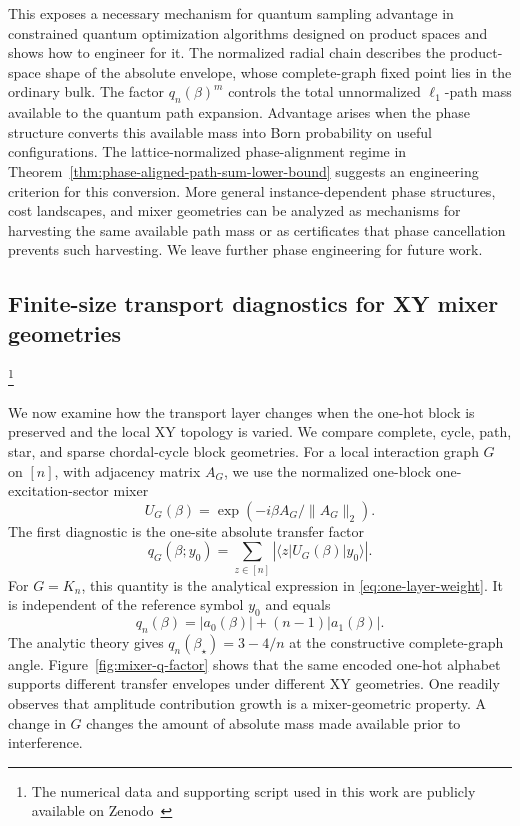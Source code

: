 \documentclass[a4paper,onecolumn,11pt,unpublished]{quantumarticle}
\theoremstyle{remark}
\begin{document}
This exposes a necessary mechanism for quantum sampling advantage in constrained quantum optimization algorithms designed on product spaces and shows how to engineer for it. The
normalized radial chain describes the product-space shape of the absolute
envelope, whose complete-graph fixed point lies in the ordinary bulk.  The
factor \(q_n(\beta)^m\) controls the total unnormalized \(\ell_1\)-path mass
available to the quantum path expansion.  Advantage arises when the phase
structure converts this available mass into Born probability on useful
configurations.  The lattice-normalized phase-alignment regime in
Theorem~\ref{thm:phase-aligned-path-sum-lower-bound} suggests an engineering criterion for this conversion.  More general instance-dependent phase structures, cost landscapes, and mixer geometries can be analyzed as mechanisms for harvesting the same available path mass or as certificates that phase cancellation prevents such harvesting. We leave further phase engineering for future work.





\subsection{Finite-size transport diagnostics for XY mixer geometries}
\label{subsec:numerical-transport-diagnostics}
\footnote{The numerical data and supporting script used in this work are publicly available on Zenodo~\cite{Michielsen2026GeometryInterferenceData}}

We now examine how the transport layer changes when the one-hot block is preserved and the local XY topology is varied. We compare complete, cycle, path, star, and sparse chordal-cycle block geometries. For a local interaction graph \(G\) on \([n]\), with adjacency matrix \(A_G\), we use the normalized one-block one-excitation-sector mixer
\[
        U_G(\beta)=\exp\!\left(-i\beta A_G/\|A_G\|_2\right).
\]
The first diagnostic is the one-site absolute transfer factor
\[
        q_G(\beta;y_0)
        =
        \sum_{z\in[n]}
        \left|\langle z|U_G(\beta)|y_0\rangle\right|.
\]
For \(G=K_n\), this quantity is the analytical expression in \cref{eq:one-layer-weight}. It is independent of the reference symbol \(y_0\) and equals
\[
        q_n(\beta)=|a_0(\beta)|+(n-1)|a_1(\beta)|.
\]
The analytic theory gives \(q_n(\beta_\star)=3-4/n\) at the constructive
complete-graph angle. Figure~\ref{fig:mixer-q-factor} shows that the same
encoded one-hot alphabet supports different transfer envelopes under different
XY geometries. One readily observes that amplitude contribution growth is a mixer-geometric property. A change in \(G\) changes the amount of absolute mass made available prior to interference.
\end{document}
